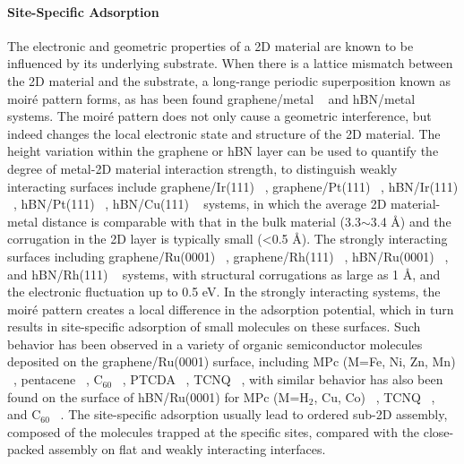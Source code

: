 \paragraph{Site-Specific Adsorption}
\label{sec:org87b0c12}

The electronic and geometric properties of a 2D material are known to be
influenced by its underlying substrate. When there is a lattice
mismatch between the 2D material and the substrate, a long-range
periodic superposition known as moiré pattern forms, as has been
found graphene/metal ~\cite{Hamalainen_2013_moire_gr} and hBN/metal
~\cite{Schulz_2014_hBN_moire} systems.  The
moiré pattern does not only cause a geometric interference, but
indeed changes the local electronic state and structure of the 2D
material.
%
The height variation within the graphene or hBN layer can be used to
quantify the degree of metal-2D material interaction strength, to
distinguish weakly interacting surfaces include graphene/Ir(111)
~\cite{Pletikosi_2009_gr_Ir,Busse_2011_Gr_Ir,Hamalainen_2013_moire_gr},
graphene/Pt(111) ~\cite{Sutter_2009_Gr_Pt}, hBN/Ir(111)
~\cite{Schulz_2014_hBN_moire}, hBN/Pt(111) ~\cite{Cavar_2008_hBN_Pt},
hBN/Cu(111) ~\cite{Joshi_2012_hBN_Cu} systems, in which the average 2D
material-metal distance is comparable with that in the bulk material
(3.3$\sim{}$3.4 \AA{}) and the corrugation in the 2D layer is
typically small (<0.5 \AA{}). The strongly interacting surfaces
including graphene/\allowbreak{}Ru(0001)
~\cite{Moritz_2010_gr_Ru,Sutter_2008_gr_Ru}, graphene/Rh(111)
~\cite{Wang_2010_gr_Rh}, hBN/Ru(0001) ~\cite{Wang_2010_gr_Rh}, and
hBN/Rh(111) ~\cite{Dil_2008_hBN_Rh} systems, with structural
corrugations as large as 1 \AA{}, and the electronic fluctuation up to
0.5 eV. In the strongly interacting systems, the moiré pattern creates
a local difference in the adsorption potential, which in turn results
in site-specific adsorption of small molecules on these surfaces. Such
behavior has been observed in a variety of organic semiconductor
molecules deposited on the graphene/\allowbreak{}Ru(0001) surface,
including MPc (M=Fe, Ni, Zn, Mn)
~\cite{Mao_2009_Pc_gr_kagome,Zhang_2011_FePc_gr}, pentacene
~\cite{Zhou_2013_penta_gr_Ru}, C\(_{\text{60}}\)
~\cite{Li_2012_c60_gr_Ru}, PTCDA ~\cite{Zhou_2011_PTCDA_gr_Ru}, TCNQ
~\cite{Maccariello_2014_TCNQ_gr_Ru}, with similar behavior has also
been found on the surface of hBN/Ru(0001) for MPc (M=H\(_{\text{2}}\),
Cu, Co) ~\cite{Dil_2008_hBN_Rh,Jarvinen_2014_MPc_hBN_Ru}, TCNQ
~\cite{Joshi_2014_TCNQ_hBN}, and C\(_{\text{60}}\)
~\cite{Corso_2004_C60_hBN}. The site-specific adsorption usually lead
to ordered sub-2D assembly, composed of the molecules trapped at the
specific sites, compared with the close-packed assembly on flat and
weakly interacting interfaces.

